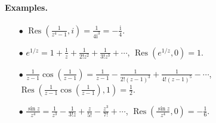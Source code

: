 \documentclass{article}
\numberwithin{equation}{section}
\DeclareMathOperator{\res}{Res}
\renewcommand{\i}{\mathrm{i}}
\theoremstyle{plain}
\theoremstyle{definition}
\begin{document}
\paragraph{Examples.}

\begin{itemize}
\item[$\bullet$]\vspace{0.1cm} $\displaystyle\res\left(\frac{1}{z^4-1},i\right)=\frac{1}{4\i^3}=-\frac{\i}{4}$.
\item[$\bullet$]\vspace{0.1cm} $\displaystyle e^{1/z}=1+\frac{1}{z}+\frac{1}{2!z^2}+\frac{1}{3!z^3}+\cdots$,  $\res(e^{1/z}, 0)=1$.
\item[$\bullet$]\vspace{0.1cm} $\displaystyle \frac{1}{z-1}\cos\left(\frac{1}{z-1}\right)=\frac{1}{z-1}-\frac{1}{2!(z-1)^3}+\frac{1}{4!(z-1)^5}-\cdots$,  $\displaystyle\res\left(\frac{1}{z-1}\cos\left(\frac{1}{z-1}\right),1\right)=\frac{1}{2}$.
\item[$\bullet$]\vspace{0.1cm} $\displaystyle\frac{\sin z}{z^4}=\frac{1}{z^3}-\frac{1}{3!z}+\frac{z}{5!}-\frac{z^3}{7!}+\cdots$, $\displaystyle\res\left(\frac{\sin z}{z^4},0\right)=-\frac{1}{6}$.
\end{itemize}
\end{document}
